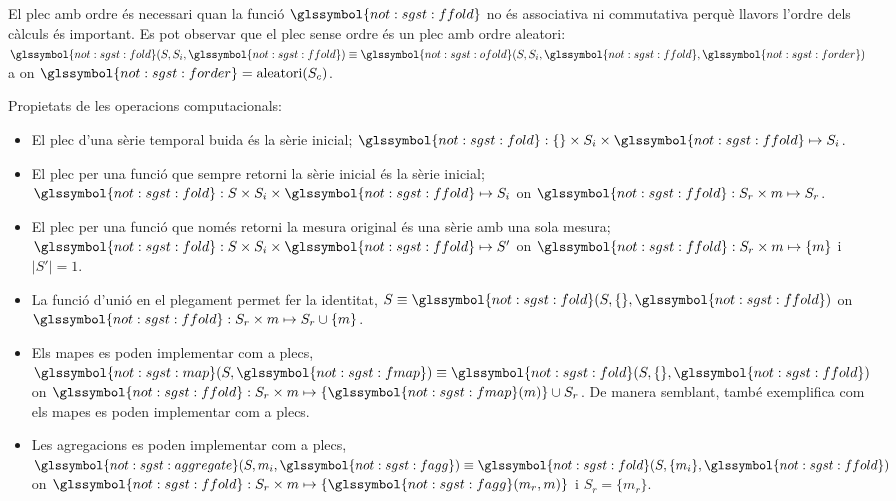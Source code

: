 El plec amb ordre és necessari quan la funció
$\glssymbol{not:sgst:ffold}$ no és associativa ni commutativa perquè
llavors l'ordre dels càlculs és important. Es pot observar que el plec
sense ordre és un plec amb ordre aleatori:
$\glssymbol{not:sgst:fold}(S,S_i,\glssymbol{not:sgst:ffold})\equiv
\glssymbol{not:sgst:ofold}(S,S_i,\glssymbol{not:sgst:ffold},
\glssymbol{not:sgst:forder})$ a on
$\glssymbol{not:sgst:forder}=\text{aleatori}(S_c)$.




Propietats de les operacions computacionals:
\begin{itemize}
\item El plec d'una sèrie temporal buida és la sèrie inicial;
  $\glssymbol{not:sgst:fold}: \{\} \times S_i \times
  \glssymbol{not:sgst:ffold} \mapsto S_i$.

\item El plec per una funció que sempre retorni la sèrie inicial és la
  sèrie inicial; $\glssymbol{not:sgst:fold}: S \times S_i \times \glssymbol{not:sgst:ffold} \mapsto S_i$ on
  $\glssymbol{not:sgst:ffold}: S_r \times m \mapsto S_r$.

\item El plec per una funció que només retorni la mesura original és
  una sèrie amb una sola mesura; $\glssymbol{not:sgst:fold}: S \times
  S_i \times \glssymbol{not:sgst:ffold} \mapsto S'$ on
  $\glssymbol{not:sgst:ffold}:S_r\times m \mapsto \{m\}$ i $|S'|=1$.


\item La funció d'unió en el plegament permet fer la identitat, $S
  \equiv \glssymbol{not:sgst:fold}(S,\{\},\glssymbol{not:sgst:ffold})$
  on $\glssymbol{not:sgst:ffold}: S_r \times m \mapsto S_r \cup \{m\}$.


\item Els mapes es poden implementar com a plecs,
  $\glssymbol{not:sgst:map}(S,\glssymbol{not:sgst:fmap}) \equiv
  \glssymbol{not:sgst:fold}(S,\{\},\glssymbol{not:sgst:ffold})$ on
  $\glssymbol{not:sgst:ffold}: S_r \times m \mapsto
  \{\glssymbol{not:sgst:fmap}(m)\} \cup S_r$.  De manera semblant,
  \textcite{lammel08:mapreduce} també exemplifica com els mapes es
  poden implementar com a plecs. %

\item Les agregacions es poden implementar com a plecs,
  $\glssymbol{not:sgst:aggregate}(S,m_i,\glssymbol{not:sgst:fagg})
  \equiv
  \glssymbol{not:sgst:fold}(S,\{m_i\},\glssymbol{not:sgst:ffold})$ on
  $\glssymbol{not:sgst:ffold}: S_r \times m \mapsto
  \{\glssymbol{not:sgst:fagg}(m_r,m)\}$ i $S_r =\{m_r\}$.

\end{itemize}





